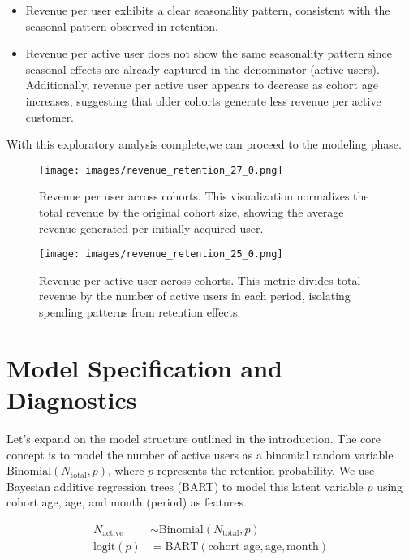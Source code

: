 \documentclass[11pt]{amsart}
\theoremstyle{definition}
\begin{document}
\begin{itemize}
    \item Revenue per user exhibits a clear seasonality pattern, consistent with the seasonal pattern observed in retention.
    \item Revenue per active user does not show the same seasonality pattern since seasonal effects are already captured in
          the denominator (active users). Additionally, revenue per active user appears to decrease as cohort age increases,
          suggesting that older cohorts generate less revenue per active customer. \\
\end{itemize}

With this exploratory analysis complete,we can proceed to the modeling phase.

\begin{figure}
    \centering
    \texttt{[image: images/revenue\_retention\_27\_0.png]}
    \caption{Revenue per user across cohorts. This visualization normalizes the total revenue by the original cohort size,
        showing the average revenue generated per initially acquired user.}
    \label{fig:revenue_per_user}
\end{figure}

\begin{figure}
    \centering
    \texttt{[image: images/revenue\_retention\_25\_0.png]}
    \caption{Revenue per active user across cohorts. This metric divides total revenue by the number of active users in each
        period, isolating spending patterns from retention effects.}
    \label{fig:revenue_per_active_user}
\end{figure}

\section{Model Specification and Diagnostics}
Let's expand on the model structure outlined in the introduction. The core concept is to model the number of active users as
a binomial random variable $\text{Binomial}(N_{\text{total}}, p)$, where $p$ represents the retention probability.
We use Bayesian additive regression trees (BART) to model this latent variable $p$ using cohort age, age, and month (period)
as features.

\begin{align*}
    N_{\text{active}} & \sim \text{Binomial}(N_{\text{total}}, p)                  \\
    \textrm{logit}(p) & = \text{BART}(\text{cohort age}, \text{age}, \text{month})
\end{align*}
\end{document}
